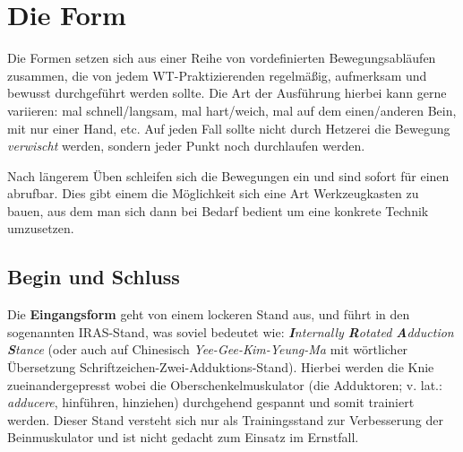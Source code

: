 

\newenvironment{WTSatz}[1]
	{\WTGaleryResetSlideshowCounter \subsection{#1}}
	{}

\newenvironment{WTSatzTeil}[2]
	{\paragraph{#1} (\textit{#2})}
	{}

\def\WTXFormen_EingangsGraphics#1{\texttt{[image: resources/images/eingangsform/\#1]}}


\renewcommand\chapterillustration{pushing_minimalistisch}
\chapter{Die Form}

Die Formen setzen sich aus einer Reihe von vordefinierten Bewegungsabl\"aufen zusammen, die von jedem WT-Praktizierenden regelm\"a{\ss}ig, aufmerksam und bewusst durchgef\"uhrt werden sollte. Die Art der Ausf\"uhrung hierbei kann gerne variieren: mal schnell/langsam, mal hart/weich, mal auf dem einen/anderen Bein, mit nur einer Hand, etc. Auf jeden Fall sollte nicht durch Hetzerei die Bewegung \textit{verwischt} werden, sondern jeder Punkt noch durchlaufen werden.

Nach l\"angerem \"Uben schleifen sich die Bewegungen ein und sind sofort f\"ur einen abrufbar. Dies gibt einem die M\"oglichkeit sich eine Art Werkzeugkasten zu bauen, aus dem man sich dann bei Bedarf bedient um eine konkrete Technik umzusetzen.

\newpage


\section{Begin und Schluss}

Die \textbf{Eingangsform} geht von einem lockeren Stand aus, und f\"uhrt in den sogenannten IRAS-Stand, was soviel bedeutet wie: \textit{\textbf{I}nternally \textbf{R}otated \textbf{A}dduction \textbf{S}tance} (oder auch auf Chinesisch \textit{Yee-Gee-Kim-Yeung-Ma} mit w\"ortlicher \"Ubersetzung Schriftzeichen-Zwei-Adduktions-Stand). Hierbei werden die Knie zueinandergepresst wobei die Oberschenkelmuskulator (die Adduktoren; v. lat.: \textit{adducere}, hinf\"uhren, hinziehen) durchgehend gespannt und somit trainiert werden. Dieser Stand versteht sich nur als Trainingsstand zur Verbesserung der Beinmuskulator und ist nicht gedacht zum Einsatz im Ernstfall.

